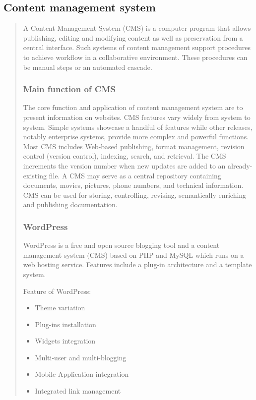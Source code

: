 \documentclass[35pt]{report}
\begin{document}
			\subsection{Content management system}
			\begin{quote}
			A Content Management System (CMS) is a computer program that allows publishing, editing and modifying content as well as preservation from a central interface. Such systems of content management support procedures to achieve workflow in a collaborative environment. These procedures can be manual steps or an automated cascade. 

				\subsubsection{Main function of CMS}
			The core function and application of content management system are to present information on websites. CMS features vary widely from system to system. Simple systems showcase a handful of features while other releases, notably enterprise systems, provide more complex and powerful functions. Most CMS includes Web-based publishing, format management, revision control (version control), indexing, search, and retrieval. The CMS increments the version number when new updates are added to an already-existing file. A CMS may serve as a central repository containing documents, movies, pictures, phone numbers, and technical information. CMS can be used for storing, controlling, revising, semantically enriching and publishing documentation.

				\subsubsection{WordPress}
WordPress is a free and open source blogging tool and a content management system (CMS) based on PHP and MySQL which runs on a web hosting service. Features include a plug-in architecture and a template system. 

				Feature of WordPress:
				\begin{itemize}
					\item Theme variation
					\item Plug-ins installation 
					\item Widgets integration
					\item Multi-user and multi-blogging
					\item Mobile Application integration
					\item Integrated link management
				\end{itemize}

			\end{quote}
			\clearpage
\end{document}
